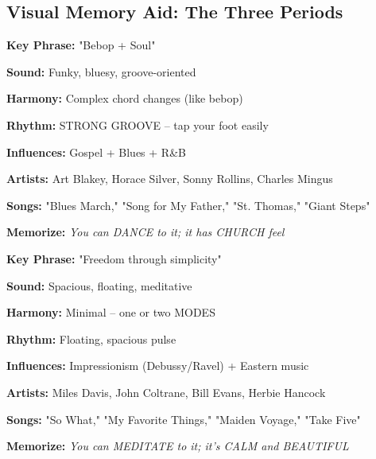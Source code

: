 \documentclass[11pt]{article}
\begin{document}
\newpage

\subsection*{Visual Memory Aid: The Three Periods}

\begin{center}
\begin{tcolorbox}[colback=hardbop!10, colframe=hardbop, width=0.9\textwidth, title=\textbf{\Large Week 5: HARD BOP}]
\textbf{Key Phrase:} "Bebop + Soul"

\textbf{Sound:} \textcolor{hardbop}{Funky, bluesy, groove-oriented}

\textbf{Harmony:} Complex chord changes (like bebop)

\textbf{Rhythm:} STRONG GROOVE – tap your foot easily

\textbf{Influences:} Gospel + Blues + R\&B

\textbf{Artists:} Art Blakey, Horace Silver, Sonny Rollins, Charles Mingus

\textbf{Songs:} "Blues March," "Song for My Father," "St. Thomas," "Giant Steps"

\textbf{Memorize:} \textit{You can DANCE to it; it has CHURCH feel}
\end{tcolorbox}

\vspace{15pt}

\begin{tcolorbox}[colback=modal!10, colframe=modal, width=0.9\textwidth, title=\textbf{\Large Week 6: MODAL JAZZ}]
\textbf{Key Phrase:} "Freedom through simplicity"

\textbf{Sound:} \textcolor{modal}{Spacious, floating, meditative}

\textbf{Harmony:} Minimal – one or two MODES

\textbf{Rhythm:} Floating, spacious pulse

\textbf{Influences:} Impressionism (Debussy/Ravel) + Eastern music

\textbf{Artists:} Miles Davis, John Coltrane, Bill Evans, Herbie Hancock

\textbf{Songs:} "So What," "My Favorite Things," "Maiden Voyage," "Take Five"

\textbf{Memorize:} \textit{You can MEDITATE to it; it's CALM and BEAUTIFUL}
\end{tcolorbox}

\vspace{15pt}


\end{center}
\end{document}
